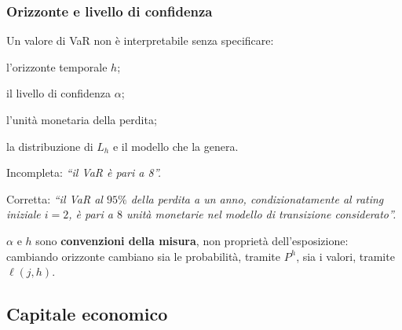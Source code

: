 \begin{frame}%
%

\frametitle{Orizzonte e livello di confidenza}%
%

%


Un valore di VaR non \`{e} interpretabile senza specificare:

\begin{stepitemize}
\item l'orizzonte temporale $h$;

\item il livello di confidenza $\alpha$;

\item l'unit\`{a} monetaria della perdita;

\item la distribuzione di $L_{h}$ e il modello che la genera.
\end{stepitemize}

\medskip

Incompleta: \emph{``il VaR \`{e} pari a 8''.}

\smallskip

Corretta: \emph{``il VaR al $95\%$ della perdita a un anno, condizionatamente
al rating iniziale $i=2$, \`{e} pari a $8$ unit\`{a} monetarie nel modello di
transizione considerato''.}

\medskip

\begin{center}
{\small $\alpha$ e $h$ sono \textbf{convenzioni della misura}, non
propriet\`{a} dell'esposizione: cambiando orizzonte cambiano sia le
probabilit\`{a}, tramite $P^{h}$, sia i valori, tramite $\ell(j,h)$.}
\end{center}

%

\transboxout
\end{frame}%




\subsection{Capitale economico}%


